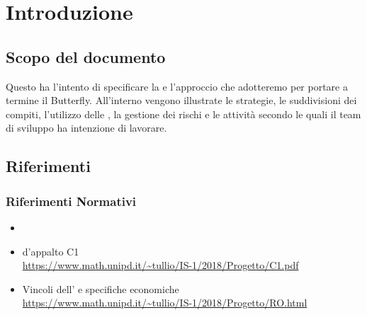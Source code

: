 \newpage
\section{Introduzione} \label{Introduzione}
	
	

	\subsection{Scopo del documento}
	Questo  ha l'intento di specificare la  e l'approccio che adotteremo per portare a termine il  Butterfly.
	All'interno vengono illustrate le strategie, le suddivisioni dei compiti, l'utilizzo delle , la gestione dei rischi e le attività secondo le quali
	il team di sviluppo ha intenzione di lavorare.

    

	\subsection{Riferimenti}
		\subsubsection{Riferimenti Normativi}\label{rifnorma}
			\begin{itemize}
				\item \NdPd
				\item {} d'appalto C1\\
				\url{https://www.math.unipd.it/~tullio/IS-1/2018/Progetto/C1.pdf}
				\item Vincoli dell' e specifiche economiche\\
				\url{https://www.math.unipd.it/~tullio/IS-1/2018/Progetto/RO.html}
			\end{itemize}

